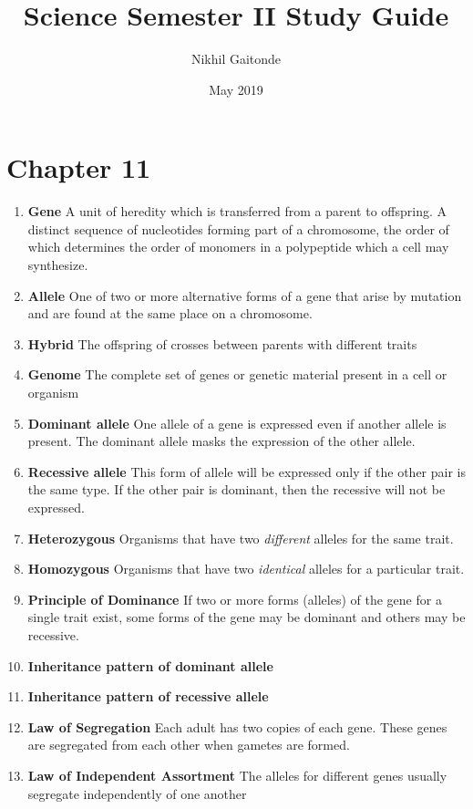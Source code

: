 \documentclass[9pt]{article}
\title{Science Semester II Study Guide}
\author{Nikhil Gaitonde }
\date{May 2019}
\begin{document}
\maketitle

\section*{Chapter 11}
\begin{enumerate}
\item {\bf Gene}
A unit of heredity which is transferred from a parent to offspring. A distinct sequence of nucleotides forming part of a chromosome, the order of which determines the order of monomers in a polypeptide which a cell may synthesize.
\item {\bf Allele}
One of two or more alternative forms of a gene that arise by mutation and are found at the same place on a chromosome.
\item {\bf Hybrid}
The offspring of crosses between parents with different traits
\item {\bf Genome}
The complete set of genes or genetic material present in a cell or organism
\item {\bf Dominant allele}
One allele of a gene is expressed even if another allele is present. The dominant allele masks the expression of the other allele.
\item {\bf Recessive allele}
This form of allele will be expressed only if the other pair is the same type. If the other pair is dominant, then the recessive will not be expressed.
\item {\bf Heterozygous}
Organisms that have two {\em different} alleles for the same trait.
\item {\bf Homozygous}
Organisms that have two {\em identical} alleles for a particular trait.
\item {\bf Principle of Dominance} If two or more forms (alleles) of
  the gene for a single trait exist, some forms of the gene may be
  dominant and others may be recessive.
\item {\bf Inheritance pattern of dominant allele}
\item {\bf Inheritance pattern of recessive allele}
\item {\bf Law of Segregation} Each adult has two copies of each
  gene. These genes are segregated from each other when gametes are
  formed.
\item {\bf Law of Independent Assortment} The alleles for different
  genes usually segregate independently of one another

\end{enumerate}
\end{document}

